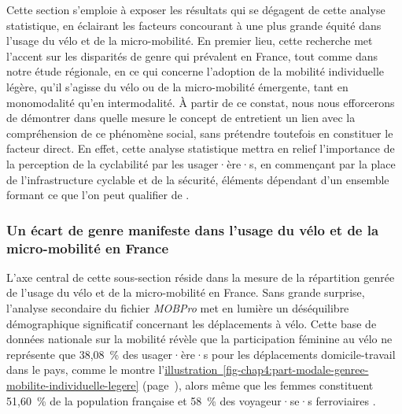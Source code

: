 \begin{refsegment}
Cette section s'emploie à exposer les résultats qui se dégagent de cette analyse statistique, en éclairant les facteurs concourant à une plus grande équité dans l'usage du vélo et de la micro-mobilité. En premier lieu, cette recherche met l'accent sur les disparités de genre qui prévalent en France, tout comme dans notre étude régionale, en ce qui concerne l'adoption de la mobilité individuelle légère, qu'il s'agisse du vélo ou de la micro-mobilité émergente, tant en monomodalité qu'en intermodalité. À partir de ce constat, nous nous efforcerons de démontrer dans quelle mesure le concept de  entretient un lien avec la compréhension de ce phénomène social, sans prétendre toutefois en constituer le facteur direct. En effet, cette analyse statistique mettra en relief l'importance de la perception de la cyclabilité par les usager·ère·s, en commençant par la place de l'infrastructure cyclable et de la sécurité, éléments dépendant d'un ensemble formant ce que l'on peut qualifier de .%

\subsubsection*{Un écart de genre manifeste dans l'usage du vélo et de la micro-mobilité en France
    \label{chap4:ecart-genre}
    }

L'axe central de cette sous-section réside dans la mesure de la répartition genrée de l'usage du vélo et de la micro-mobilité en France. Sans grande surprise, l'analyse secondaire du fichier \textsl{MOBPro} met en lumière un déséquilibre démographique significatif concernant les déplacements à vélo. Cette base de données nationale sur la mobilité révèle que la participation féminine au vélo ne représente que 38,08~\% des usager·ère·s pour les déplacements domicile-travail dans le pays, comme le montre l'\hyperref[fig-chap4:part-modale-genree-mobilite-individuelle-legere]{illustration~\ref{fig-chap4:part-modale-genree-mobilite-individuelle-legere}} (page~\pageref{fig-chap4:part-modale-genree-mobilite-individuelle-legere}), alors même que les femmes constituent 51,60~\% de la population française \textcolor{blue}{\autocite{insee_documentation_2023}} et 58~\% des voyageur·se·s ferroviaires \textcolor{blue}{\autocite{enov_enquete_2021}}.%


\end{refsegment}
